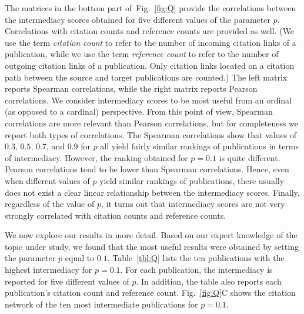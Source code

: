 \documentclass[9pt,twocolumn,twoside,lineno]{pnas-alt}
\theoremstyle{definition}
\newcommand{\figref}[1]{Fig.~\ref{fig:#1}\xspace}
\newcommand{\subfigref}[2]{Fig.~\ref{fig:#1}#2\xspace}
\newcommand{\tblref}[1]{Table~\ref{tbl:#1}\xspace}
\begin{document}
The matrices in the bottom part of~\figref{Q} provide the correlations between the intermediacy scores obtained for five different values of the parameter $p$. Correlations with citation counts and reference counts are provided as well. (We use the term \emph{citation count} to refer to the number of incoming citation links of a publication, while we use the term \emph{reference count} to refer to the number of outgoing citation links of a publication. Only citation links located on a citation path between the source and target publications are counted.) The left matrix reports Spearman correlations, while the right matrix reports Pearson correlations. We consider intermediacy scores to be most useful from an ordinal (as opposed to a cardinal) perspective. From this point of view, Spearman correlations are more relevant than Pearson correlations, but for completeness we report both types of correlations. The Spearman correlations show that values of $0.3$, $0.5$, $0.7$, and $0.9$ for $p$ all yield fairly similar rankings of publications in terms of intermediacy. However, the ranking obtained for $p = 0.1$ is quite different. Pearson correlations tend to be lower than Spearman correlations. Hence, even when different values of $p$ yield similar rankings of publications, there usually does not exist a clear linear relationship between the intermediacy scores. Finally, regardless of the value of $p$, it turns out that intermediacy scores are not very strongly correlated with citation counts and reference counts.

We now explore our results in more detail. Based on our expert knowledge of the topic under study, we found that the most useful results were obtained by setting the parameter $p$ equal to $0.1$. \tblref{Q} lists the ten publications with the highest intermediacy for $p = 0.1$. For each publication, the intermediacy is reported for five different values of $p$. In addition, the table also reports each publication’s citation count and reference count. \subfigref{Q}{C} shows the citation network of the ten most intermediate publications for $p = 0.1$.
\end{document}
